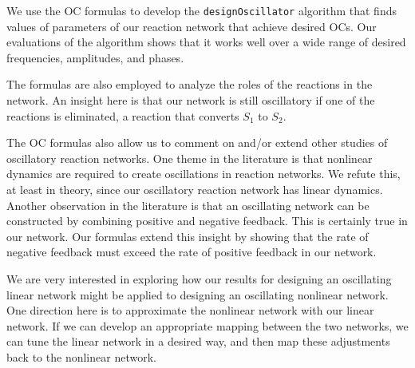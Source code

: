 \documentclass{bmcart}
\begin{document}
We use the OC formulas to develop the {\tt designOscillator} algorithm that finds values of parameters of our reaction network that achieve desired OCs. Our evaluations of the algorithm shows that it works well over a wide range of desired frequencies, amplitudes, and phases.

The formulas are also employed to analyze the roles of the reactions in the network. An insight here is that our network is still oscillatory if one of the reactions is eliminated, a reaction that converts $S_1$ to $S_2$. 

The OC formulas also allow us to comment on and/or extend other studies of oscillatory reaction networks. One theme in the literature is that nonlinear dynamics are required to create oscillations in reaction networks. We refute this, at least in theory, since our oscillatory reaction network has linear dynamics. Another observation in the literature is that an oscillating network can be constructed by combining positive and negative feedback. This is certainly true in our network. Our formulas extend this insight by showing that the rate of negative feedback must exceed the rate of positive feedback in our network.

We are very interested in exploring how our results for designing an oscillating linear network might be applied to designing an oscillating nonlinear network. One direction here is to approximate the nonlinear network with our linear network. If we can develop an appropriate mapping between the two networks, we can tune the linear network in a desired way, and then map these adjustments back to the nonlinear network.


\end{document}
